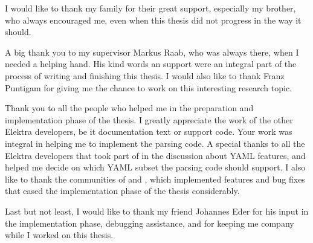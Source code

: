 \begin{acknowledgements*}
I would like to thank my family for their great support, especially my brother, who always encouraged me, even when this thesis did not progress in the way it should.

A big thank you to my supervisor Markus Raab, who was always there, when I needed a helping hand. His kind words an support were an integral part of the process of writing and finishing this thesis. I would also like to thank Franz Puntigam for giving me the chance to work on this interesting research topic.

Thank you to all the people who helped me in the preparation and implementation phase of the thesis. I greatly appreciate the work of the other Elektra developers, be it documentation text or support code. Your work was integral in helping me to implement the parsing code. A special thanks to all the Elektra developers that took part of in the discussion about YAML features, and helped me decide on which YAML subset the parsing code should support. I also like to thank the communities of  and , which implemented features and bug fixes that eased the implementation phase of the thesis considerably.

Last but not least, I would like to thank my friend Johannes Eder for his input in the implementation phase, debugging assistance, and for keeping me company while I worked on this thesis.
\end{acknowledgements*}
